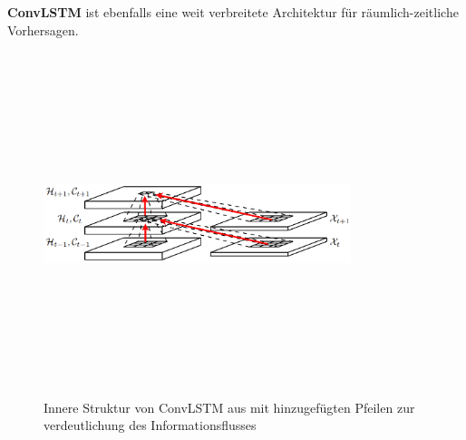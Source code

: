 \textbf{ConvLSTM} ist ebenfalls eine weit verbreitete Architektur für räumlich-zeitliche Vorhersagen.

\begin{figure}[h]
    \centering
    \includegraphics[width=0.8\textwidth,height=10cm,keepaspectratio=true]{content/images/ConvLSTMStructure.png}
    \caption{Innere Struktur von ConvLSTM aus \cite{ConvLSTM} mit hinzugefügten Pfeilen zur verdeutlichung des Informationsflusses}
    \label{fig:ConvLSTMStructure}
\end{figure}

